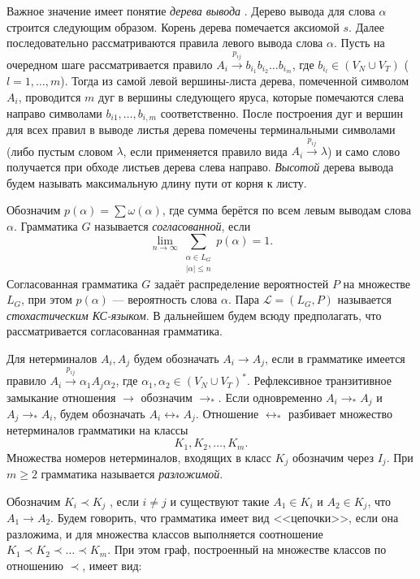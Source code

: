 \documentclass[10pt]{article}
\renewcommand{\leq}{\leqslant}
\renewcommand{\geq}{\geqslant}
\begin{document}
Важное значение имеет понятие \textit{дерева вывода} \cite{aho-ulman-syntax}. Дерево вывода для слова $\alpha$ строится следующим образом. Корень дерева помечается аксиомой $s$. Далее последовательно рассматриваются правила левого вывода слова $\alpha$. Пусть на очередном шаге рассматривается правило $A_i \xrightarrow{p_{ij}} b_{i_1} b_{i_2} \ldots b_{i_m}$, где $b_{i_l} \in (V_N \cup V_T)$ ($l = 1,\ldots,m$). Тогда из самой левой вершины-листа дерева, помеченной символом $A_i$, проводится $m$ дуг в вершины следующего яруса, которые помечаются слева направо символами $b_{i1}, \ldots, b_{i,m}$ соответственно. После построения дуг и вершин для всех правил в выводе листья дерева помечены терминальными символами (либо пустым словом $\lambda$, если применяется правило вида $A_i \xrightarrow{p_{ij}} \lambda$) и само слово получается при обходе листьев дерева слева направо. \textit{Высотой} дерева вывода будем называть максимальную длину пути от корня к листу.

Обозначим $p(\alpha) = \sum \omega(\alpha)$, где сумма берётся по всем левым выводам слова $\alpha$. Грамматика $G$ называется \textit{согласованной}, если
\begin{equation}
\label{eq:soglas}
	\lim_{n \rightarrow \infty} \sum_{\substack{\alpha \in L_G\\\left|\alpha\right| \leq n}} p(\alpha) = 1.
\end{equation}
Согласованная грамматика $G$ задаёт распределение вероятностей $P$ на множестве $L_G$, при этом $p(\alpha)$ --- вероятность слова $\alpha$. Пара $\mathcal{L} = (L_G, P)$ называется \textit{стохастическим КС-языком}. В дальнейшем будем всюду предполагать, что рассматривается согласованная грамматика.

Для нетерминалов $A_i, A_j$ будем обозначать $A_i \rightarrow A_j$, если в грамматике имеется правило $A_i \xrightarrow{p_{ij}} \alpha_1 A_j \alpha_2$, где $\alpha_1, \alpha_2 \in (V_N \cup V_T)^*$. Рефлексивное транзитивное замыкание отношения $\rightarrow$ обозначим $\rightarrow_*$. Если одновременно $A_i \rightarrow_* A_j$ и $A_j \rightarrow_* A_i$, будем обозначать $A_i \leftrightarrow_* A_j$. Отношение $\leftrightarrow_*$ разбивает множество нетерминалов грамматики на классы
\begin{equation}
	K_1, K_2, \ldots, K_m.
\end{equation}
Множества номеров нетерминалов, входящих в класс $K_j$ обозначим через $I_j$. При $m \geq 2$ грамматика называется \textit{разложимой}.

Обозначим $K_i \prec K_j$ , если $i \neq j$ и существуют такие $A_1 \in K_i$ и $A_2 \in K_j$, что $A_1 \rightarrow A_2$. Будем говорить, что грамматика имеет вид <<цепочки>>, если она разложима, и для множества классов выполняется соотношение $K_1 \prec K_2 \prec \ldots \prec K_m$. При этом граф, построенный на множестве классов по отношению $\prec$, имеет вид:
\end{document}
